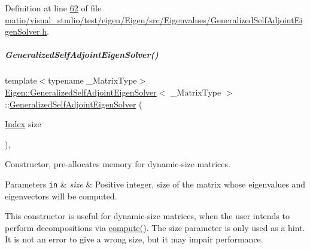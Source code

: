 Definition at line \hyperlink{matio_2visual__studio_2test_2eigen_2_eigen_2src_2_eigenvalues_2_generalized_self_adjoint_eigen_solver_8h_source_l00062}{62} of file \hyperlink{matio_2visual__studio_2test_2eigen_2_eigen_2src_2_eigenvalues_2_generalized_self_adjoint_eigen_solver_8h_source}{matio/visual\+\_\+studio/test/eigen/\+Eigen/src/\+Eigenvalues/\+Generalized\+Self\+Adjoint\+Eigen\+Solver.\+h}.

\mbox{\label{group___eigenvalues___module_aac849f01a8c6148c645acd10bd3a9b0e}} 
\subparagraph{\texorpdfstring{Generalized\+Self\+Adjoint\+Eigen\+Solver()}{GeneralizedSelfAdjointEigenSolver()}\hspace{0.1cm}{\footnotesize\ttfamily [5/6]}}
{\footnotesize\ttfamily template$<$typename \+\_\+\+Matrix\+Type$>$ \\
\hyperlink{group___eigenvalues___module_class_eigen_1_1_generalized_self_adjoint_eigen_solver}{Eigen\+::\+Generalized\+Self\+Adjoint\+Eigen\+Solver}$<$ \+\_\+\+Matrix\+Type $>$\+::\hyperlink{group___eigenvalues___module_class_eigen_1_1_generalized_self_adjoint_eigen_solver}{Generalized\+Self\+Adjoint\+Eigen\+Solver} (\begin{DoxyParamCaption}\item[{\hyperlink{group___eigenvalues___module_a8a59ab7734b6eae2754fd78bc7c3a360}{Index}}]{size }\end{DoxyParamCaption})\hspace{0.3cm}{\ttfamily [inline]}, {\ttfamily [explicit]}}



Constructor, pre-\/allocates memory for dynamic-\/size matrices. 


\begin{DoxyParams}[1]{Parameters}
\mbox{\tt in}  & {\em size} & Positive integer, size of the matrix whose eigenvalues and eigenvectors will be computed.\\
\hline
\end{DoxyParams}
This constructor is useful for dynamic-\/size matrices, when the user intends to perform decompositions via \hyperlink{group___eigenvalues___module_a724764fe196612b752042692156ed023}{compute()}. The {\ttfamily size} parameter is only used as a hint. It is not an error to give a wrong {\ttfamily size}, but it may impair performance.


